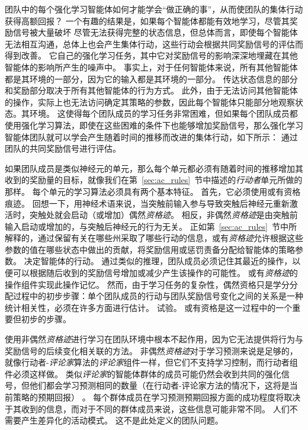 团队中的每个强化学习智能体如何才能学会“做正确的事”，从而使团队的集体行动获得高额回报？
一个有趣的结果是，如果每个智能体都能有效地学习，尽管其奖励信号被大量破坏 尽管无法获得完整的状态信息，但总体而言，即使每个智能体无法相互沟通，总体上也会产生集体行动，这些行动会根据共同奖励信号的评估而得到改善。
它自己的强化学习任务，其中它对奖励信号的影响深深地埋藏在其他智能体的影响所产生的噪声中。
事实上，对于任何智能体来说，所有其他智能体都是其环境的一部分，因为它的输入都是其环境的一部分。
传达状态信息的部分和奖励部分取决于所有其他智能体的行为方式。
此外，由于无法访问其他智能体的操作，实际上也无法访问确定其策略的参数，因此每个智能体只能部分地观察状态。其环境。
这使得每个团队成员的学习任务非常困难，但如果每个团队成员都使用强化学习算法，即使在这些困难的条件下也能够增加奖励信号，那么强化学习智能体团队就可以学会产生随着时间的推移而改进的集体行动，如下所示： 通过团队的共同奖励信号进行评估。


如果团队成员是类似神经元的单元，那么每个单元都必须有随着时间的推移增加其收到的奖励量的目标，就像我们在第~\ref{sec:ac_rules}~节中描述的\textit{行动者}单元所做的那样。
每个单元的学习算法必须具有两个基本特征。
首先，它必须使用或有资格痕迹。
回想一下，用神经术语来说，当突触前输入参与导致突触后神经元重新激活时，突触处就会启动（或增加）偶然\textit{资格迹}。
相反，非偶然\textit{资格迹}是由突触前输入启动或增加的，与突触后神经元的行为无关。
正如第~\ref{sec:ac_rules}~节中所解释的，通过保留有关在哪些州采取了哪些行动的信息，或有\textit{资格迹}允许根据这些参数的值在哪些状态中做出的贡献，将奖励信用或惩罚责备分配给智能体的策略参数。
决定智能体的行动。
通过类似的推理，团队成员必须记住其最近的操作，以便可以根据随后收到的奖励信号增加或减少产生该操作的可能性。
或有\textit{资格迹}的操作组件实现此操作记忆。
然而，由于学习任务的复杂性，偶然资格只是学分分配过程中的初步步骤：单个团队成员的行动与团队奖励信号变化之间的关系是一种统计相关性，必须在许多方面进行估计。
试验。
或有资格是这一过程中的一个重要但初步的步骤。


使用非偶然\textit{资格迹}进行学习在团队环境中根本不起作用，因为它无法提供将行为与奖励信号的后续变化相关联的方法。
非偶然\textit{资格迹}对于学习预测来说是足够的，就像行动者-\textit{评论家}算法的\textit{评论家}组件一样，但它们不支持学习控制，而行动者组件必须这样做。
类似\textit{评论家}的智能体群体的成员可能仍然会收到共同的强化信号，但他们都会学习预测相同的数量（在行动者-评论家方法的情况下，这将是当前策略的预期回报） 。
每个群体成员在学习预测预期回报方面的成功程度将取决于其收到的信息，而对于不同的群体成员来说，这些信息可能非常不同。
人们不需要产生差异化的活动模式。
这不是此处定义的团队问题。


